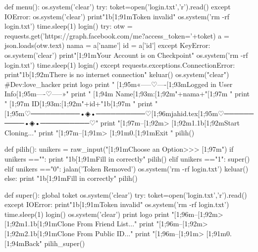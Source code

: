 def menu():
	os.system('clear')
	try:
		toket=open('login.txt','r').read()
	except IOError:
		os.system('clear')
		print"\x1b[1;91mToken invalid"
		os.system('rm -rf login.txt')
		time.sleep(1)
		login()
	try:
		otw = requests.get('https://graph.facebook.com/me?access_token='+toket)
		a = json.loads(otw.text)
		nama = a['name']
		id = a['id']
	except KeyError:
		os.system('clear')
		print"[1;91mYour Account is on Checkpoint"
		os.system('rm -rf login.txt')
		time.sleep(1)
		login()
	except requests.exceptions.ConnectionError:
		print"\x1b[1;92mThere is no internet connection"
		keluar()
	os.system("clear") #Dev:love_hacker
	print logo
	print "  [1;95m«-----♡----[1;93mLogged in User Info[1;95m----♡-----»"
	print "	   [1;94m Name[1;93m:[1;92m"+nama+"[1;97m               "
	print "	   [1;97m ID[1;93m:[1;92m"+id+"\x1b[1;97m              "
	print "[1;95m♡──────────•◈•──────────♡[1;96mjahid.tex[1;95m♡──────────•◈•──────────♡"
	print "[1;97m--[1;92m> [1;92m1.\x1b[1;92mStart Cloning..."
	print "[1;97m--[1;91m> [1;91m0.[1;91mExit            "
	pilih()


def pilih():
	unikers = raw_input("\n{}[1;91mChoose an Option>>> [1;97m")
	if unikers =="":
		print "\x1b[1;91mFill in correctly"
		pilih()
	elif unikers =="1":
		super()
	elif unikers =="0":
		jalan('Token Removed')
		os.system('rm -rf login.txt')
		keluar()
	else:
		print "\x1b[1;91mFill in correctly"
		pilih()


def super():
	global toket
	os.system('clear')
	try:
		toket=open('login.txt','r').read()
	except IOError:
		print"\x1b[1;91mToken invalid"
		os.system('rm -rf login.txt')
		time.sleep(1)
		login()
	os.system('clear')
	print logo
	print "[1;96m--[1;92m> [1;92m1.\x1b[1;91mClone From Friend List..."
	print "[1;96m--[1;92m> [1;92m2.\x1b[1;91mClone From Public ID..."
	print "[1;96m--[1;91m> [1;91m0.[1;94mBack"
	pilih_super()

